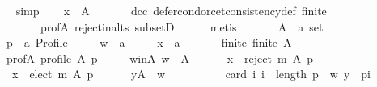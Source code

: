 \begin{isabellebody}
\ \ \ \ \isamarkupfalse%
\ simp\isanewline
\ \ \isamarkupfalse%
\ {\isachardoublequoteopen}x\ {\isasymin}\ A{\isachardoublequoteclose}\isanewline
\ \ \ \ \isamarkupfalse%
\ {\isachardoublequoteopen}{}{\isachardoublequoteclose}\ dcc\ defer{\isacharunderscore}{\kern0pt}condorcet{\isacharunderscore}{\kern0pt}consistency{\isacharunderscore}{\kern0pt}def\ finite\isanewline
\ \ \ \ \ \ \ \ \ \ prof{\isacharunderscore}{\kern0pt}A\ reject{\isacharunderscore}{\kern0pt}in{\isacharunderscore}{\kern0pt}alts\ subsetD\isanewline
\ \ \ \ \isamarkupfalse%
\ metis\isanewline
{}\isamarkupfalse%
\isanewline
\ \ \isamarkupfalse%
\isanewline
\ \ \ \ A\ {\isacharcolon}{\kern0pt}{\isacharcolon}{\kern0pt}\ {\isachardoublequoteopen}{\isacharprime}{\kern0pt}a\ set{\isachardoublequoteclose}\ \isanewline
\ \ \ \ p\ {\isacharcolon}{\kern0pt}{\isacharcolon}{\kern0pt}\ {\isachardoublequoteopen}{\isacharprime}{\kern0pt}a\ Profile{\isachardoublequoteclose}\ \isanewline
\ \ \ \ w\ {\isacharcolon}{\kern0pt}{\isacharcolon}{\kern0pt}\ {\isachardoublequoteopen}{\isacharprime}{\kern0pt}a{\isachardoublequoteclose}\ \isanewline
\ \ \ \ x\ {\isacharcolon}{\kern0pt}{\isacharcolon}{\kern0pt}\ {\isachardoublequoteopen}{\isacharprime}{\kern0pt}a{\isachardoublequoteclose}\isanewline
\ \ \isamarkupfalse%
\isanewline
\ \ \ \ finite{\isacharcolon}{\kern0pt}\ {\isachardoublequoteopen}finite\ A{\isachardoublequoteclose}\ \isanewline
\ \ \ \ prof{\isacharunderscore}{\kern0pt}A{\isacharcolon}{\kern0pt}\ {\isachardoublequoteopen}profile\ A\ p{\isachardoublequoteclose}\ \isanewline
\ \ \ \ w{\isacharunderscore}{\kern0pt}in{\isacharunderscore}{\kern0pt}A{\isacharcolon}{\kern0pt}\ {\isachardoublequoteopen}w\ {\isasymin}\ A{\isachardoublequoteclose}\ \isanewline
\ \ \ \ {}{\isacharcolon}{\kern0pt}\ {\isachardoublequoteopen}x\ {\isasymin}\ reject\ m\ A\ p{\isachardoublequoteclose}\ \isanewline
\ \ \ \ {}{\isacharcolon}{\kern0pt}\ {\isachardoublequoteopen}x\ {\isasymin}\ elect\ m\ A\ p{\isachardoublequoteclose}\ \isanewline
\ \ \ \ {}{\isacharcolon}{\kern0pt}\ {\isachardoublequoteopen}{\isasymforall}y{\isasymin}A\ {\isacharminus}{\kern0pt}\ {\isacharbraceleft}{\kern0pt}w{\isacharbraceright}{\kern0pt}{\isachardot}{\kern0pt}\isanewline
\ \ \ \ \ \ \ \ \ \ card\ {\isacharbraceleft}{\kern0pt}i{\isachardot}{\kern0pt}\ i\ {\isacharless}{\kern0pt}\ length\ p\ {\isasymand}\ {\isacharparenleft}{\kern0pt}w{\isacharcomma}{\kern0pt}\ y{\isacharparenright}{\kern0pt}\ {\isasymin}\ {\isacharparenleft}{\kern0pt}p{\isacharbang}{\kern0pt}i{\isacharparenright}{\kern0pt}{\isacharbraceright}{\kern0pt}\ {\isacharless}{\kern0pt}\isanewline

\end{isabellebody}
